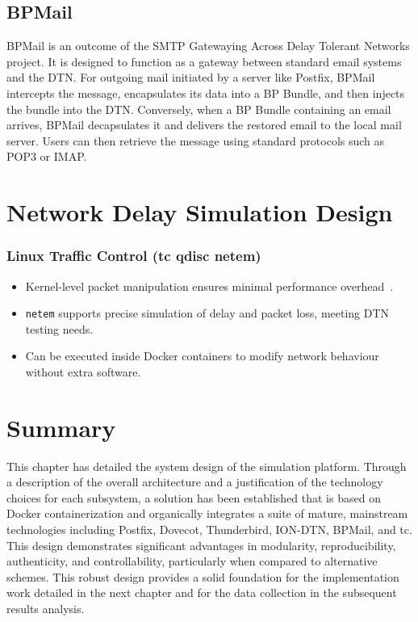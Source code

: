 \subsection{BPMail}
BPMail is an outcome of the SMTP Gatewaying Across Delay Tolerant Networks project. It is designed to function as a gateway between standard email systems and the DTN. For outgoing mail initiated by a server like Postfix, BPMail intercepts the message, encapsulates its data into a BP Bundle, and then injects the bundle into the DTN. Conversely, when a BP Bundle containing an email arrives, BPMail decapsulates it and delivers the restored email to the local mail server. Users can then retrieve the message using standard protocols such as POP3 or IMAP.

\section{Network Delay Simulation Design}

\subsubsection*{Linux Traffic Control (tc qdisc netem)}
\begin{itemize}
    \item Kernel-level packet manipulation ensures minimal performance overhead~\cite{EmulatorSurvey}.
    \item \texttt{netem} supports precise simulation of delay and packet loss, meeting DTN testing needs.
    \item Can be executed inside Docker containers to modify network behaviour without extra software.
\end{itemize}

\section{Summary}
This chapter has detailed the system design of the simulation platform. Through a description of the overall architecture and a justification of the technology choices for each subsystem, a solution has been established that is based on Docker containerization and organically integrates a suite of mature, mainstream technologies including Postfix, Dovecot, Thunderbird, ION-DTN, BPMail, and tc. This design demonstrates significant advantages in modularity, reproducibility, authenticity, and controllability, particularly when compared to alternative schemes. This robust design provides a solid foundation for the implementation work detailed in the next chapter and for the data collection in the subsequent results analysis.
